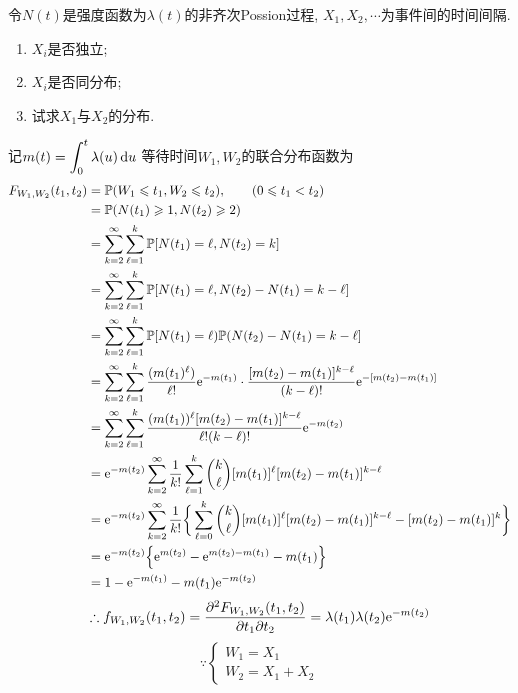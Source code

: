\begin{problem}{2.12}
令$N(t)$是强度函数为$\lambda (t)$的非齐次Possion过程, $X_1, X_2, \cdots$为事件间的时间间隔.
\begin{enumerate}[label=(\roman*)]
	\item $X_i$是否独立;
	\item $X_i$是否同分布;
	\item 试求$X_1$与$X_2$的分布.
\end{enumerate}
\end{problem}
\begin{solution}[1]
	记$\displaystyle m(t) = \int^t_0\lambda(u)\mathop{}\!\mathrm{d} u$
	等待时间$W_1,W_2$的联合分布函数为
	\[\begin{split}
			F_{W_1,W_2}(t_1,t_2) & = \mathbb{P}(W_1 \leqslant t_1, W_2 \leqslant t_2),\qquad (0\leqslant t_1 < t_2)\\
			& = \mathbb{P}(N(t_1) \geqslant 1, N(t_2) \geqslant 2)\\
			& = \sum^{\infty}_{k=2}\sum^k_{\ell=1}\mathbb{P}[N(t_1) = \ell, N(t_2) = k]\\
			& = \sum^{\infty}_{k=2}\sum^k_{\ell=1}\mathbb{P}[N(t_1) = \ell, N(t_2) - N(t_1) = k - \ell]\\
			& = \sum^{\infty}_{k=2}\sum^k_{\ell=1}\mathbb{P}[N(t_1) = \ell)\mathbb{P}(N(t_2) - N(t_1) = k - \ell]\\
			& = \sum^{\infty}_{k=2}\sum^k_{\ell=1}\frac{(m(t_1)^\ell)}{\ell !}\mathrm{e}^{-m(t_1)}\cdot \frac{[m(t_2)-m(t_1)]^{k-\ell}}{(k-\ell)!}\mathrm{e}^{-[m(t_2)-m(t_1)]}\\
			& = \sum^{\infty}_{k=2}\sum^k_{\ell=1}\frac{(m(t_1))^\ell[m(t_2)-m(t_1)]^{k-\ell}}{\ell !(k-\ell)!}\mathrm{e}^{-m(t_2)}\\
			& = \mathrm{e}^{-m(t_2)}\sum^{\infty}_{k=2}\frac{1}{k!}\sum^k_{\ell=1}\binom{k}{\ell}[m(t_1)]^\ell[m(t_2)-m(t_1)]^{k-\ell}\\
			& = \mathrm{e}^{-m(t_2)}\sum^{\infty}_{k=2}\frac{1}{k!}\bigg\{\sum^k_{\ell=0}\binom{k}{\ell}[m(t_1)]^\ell[m(t_2)-m(t_1)]^{k-\ell}-[m(t_2)-m(t_1)]^k\bigg\}\\
			& = \mathrm{e}^{-m(t_2)}\Big\{\mathrm{e}^{m(t_2)}-\mathrm{e}^{m(t_2)-m(t_1)}-m(t_1)\Big\}\\
			& = 1-\mathrm{e}^{-m(t_1)}-m(t_1)\mathrm{e}^{-m(t_2)}\\
		\end{split}\]
	\[\therefore f_{W_1,W_2}(t_1,t_2) = \frac{\partial^2F_{W_1,W_2}(t_1,t_2)}{\partial t_1\partial t_2} = \lambda(t_1)\lambda(t_2)\mathrm{e}^{-m(t_2)}\]
	\[\because
		\begin{cases}
			W_1 = X_1 \\
			W_2 = X_1 + X_2
		\end{cases}\]

\end{solution}
